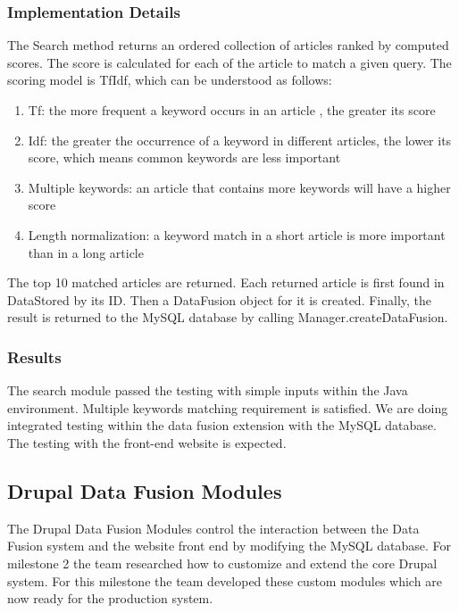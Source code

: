 \documentclass[12pt]{article} %
\begin{document}
\subsubsection{Implementation Details}

The Search method returns an ordered collection of articles ranked by computed scores. The score is calculated for each of the article to match a given query. The scoring model is TfIdf, which can be understood as follows:
\begin{enumerate}
\item Tf: the more frequent a keyword occurs in an article , the greater its score
\item Idf: the greater the occurrence of a keyword in different articles, the lower its score, which means common keywords are less important
\item Multiple keywords: an article that contains more keywords will have a higher score
\item Length normalization: a keyword match in a short article is more important than in a long article
\end{enumerate}

The top 10 matched articles are returned. Each returned article is first found in DataStored by its ID. Then a DataFusion object for it is created. Finally, the result is returned to the MySQL database by calling Manager.createDataFusion.

\subsubsection{Results}

The search module passed the testing with simple inputs within the Java environment. Multiple keywords matching requirement is satisfied. We are doing integrated testing within the data fusion extension with the MySQL database. The testing with the front-end website is expected.

\subsection{Drupal Data Fusion Modules}

The Drupal Data Fusion Modules control the interaction between the Data Fusion system and the website front end by modifying the MySQL database. For milestone 2 the team researched how to customize and extend the core Drupal system. For this milestone the team developed these custom modules which are now ready for the production system.
\end{document}
